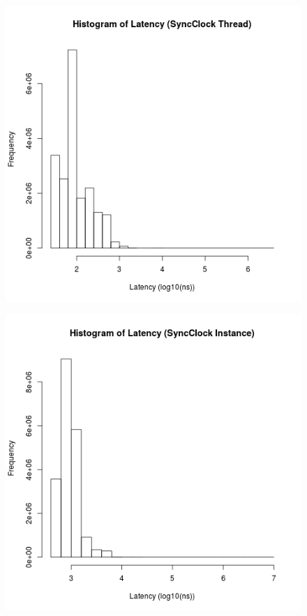 \clearpage

\begin{figure}
\center
\includegraphics[height=.25\textheight]{sync_thread_latency_hist.png}
\caption{\label{sync_thread_latency}}
\end{figure}

\begin{figure}
\center
\includegraphics[height=.25\textheight]{sync_instance_latency_hist.png}
\caption{\label{sync_instance_latency}}
\end{figure}

